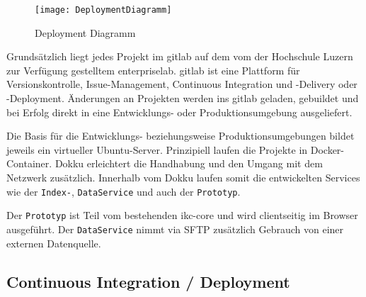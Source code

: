     \begin{figure}[H]
    \centering
    \texttt{[image: DeploymentDiagramm]}
    \caption{Deployment Diagramm}
    \label{fig:deployment-diagramm}
    \end{figure}

Grundsätzlich liegt jedes Projekt im \gls{gitlab} auf dem vom der Hochschule Luzern zur Verfügung gestelltem \gls{enterpriselab}. \gls{gitlab} ist eine Plattform für Versionskontrolle, Issue-Management, Continuous Integration und -Delivery oder -Deployment. Änderungen an Projekten werden ins \gls{gitlab} geladen, gebuildet und bei Erfolg direkt in eine Entwicklungs- oder Produktionsumgebung ausgeliefert.

Die Basis für die Entwicklungs- beziehungsweise Produktionsumgebungen bildet jeweils ein virtueller \gls{Ubuntu}-Server.
Prinzipiell laufen die Projekte in \gls{Docker}-Container. \gls{Dokku} erleichtert die Handhabung und den Umgang mit dem Netzwerk zusätzlich. Innerhalb vom \gls{Dokku} laufen somit die entwickelten Services wie der \texttt{Index-}, \texttt{DataService} und auch der \texttt{Prototyp}. 

Der \texttt{Prototyp} ist Teil vom bestehenden \gls{ikc-core} und wird clientseitig im Browser ausgeführt. Der \texttt{DataService} nimmt via \gls{SFTP} zusätzlich Gebrauch von einer externen Datenquelle.

\subsection{Continuous Integration / Deployment}

